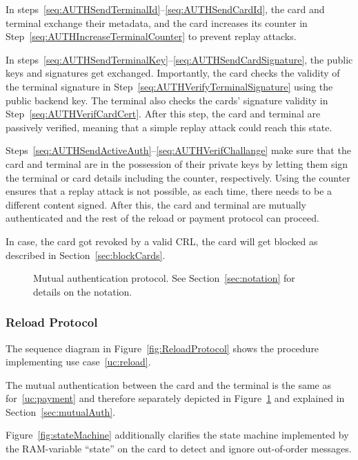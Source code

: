 \documentclass{article}
\begin{document}
In steps~\ref{seq:AUTHSendTerminalId}--\ref{seq:AUTHSendCardId}, the card and terminal exchange their metadata, and the card increases its counter in Step~\ref{seq:AUTHIncreaseTerminalCounter} to prevent replay attacks.

In steps~\ref{seq:AUTHSendTerminalKey}--\ref{seq:AUTHSendCardSignature}, the public keys and signatures get exchanged.
Importantly, the card checks the validity of the terminal signature in Step~\ref{seq:AUTHVerifyTerminalSignature} using the public backend key.
The terminal also checks the cards' signature validity in Step~\ref{seq:AUTHVerifCardCert}.
After this step, the card and terminal are passively verified, meaning that a simple replay attack could reach this state.

Steps~\ref{seq:AUTHSendActiveAuth}--\ref{seq:AUTHVerifChallange} make sure that the card and terminal are in the possession of their private keys by letting them sign the terminal or card details including the counter, respectively.
Using the counter ensures that a replay attack is not possible, as each time, there needs to be a different content signed.
After this, the card and terminal are mutually authenticated and the rest of the reload or payment protocol can proceed.

In case, the card got revoked by a valid CRL, the card will get blocked as described in Section~\ref{sec:blockCards}.

\begin{figure}
    \centering
    
    \caption{Mutual authentication protocol.
    See Section~\ref{sec:notation} for details on the notation.
    }
    \label{fig:MutualAuth}
\end{figure}

\subsubsection{Reload Protocol}
The sequence diagram in Figure~\ref{fig:ReloadProtocol} shows the procedure implementing use case~\ref{uc:reload}.

The mutual authentication between the card and the terminal is the same as for~\ref{uc:payment} and therefore separately depicted in Figure~\ref{fig:MutualAuth} and explained in Section~\ref{sec:mutualAuth}.

Figure~\ref{fig:stateMachine} additionally clarifies the state machine implemented by the  RAM-variable ``state'' on the card to detect and ignore out-of-order messages.
\end{document}
